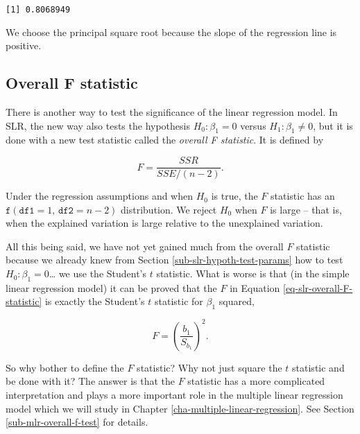 \documentclass[]{book}
\newenvironment{Shaded}{\begin{snugshade}}{\end{snugshade}}
\newcommand{\KeywordTok}[1]{\textcolor[rgb]{0.13,0.29,0.53}{\textbf{{#1}}}}
\newcommand{\NormalTok}[1]{{#1}}
\numberwithin{equation}{chapter}
\numberwithin{figure}{chapter}
\theoremstyle{plain}
\theoremstyle{definition}
\theoremstyle{remark}
\theoremstyle{definition}
\theoremstyle{definition}
\theoremstyle{remark}
\begin{document}
\begin{Shaded}
\end{Shaded}

\begin{verbatim}
[1] 0.8068949
\end{verbatim}

We choose the principal square root because the slope of the regression
line is positive.

\subsection{Overall F statistic}\label{sub-slr-overall-f-statistic}

There is another way to test the significance of the linear regression
model. In SLR, the new way also tests the hypothesis
\(H_{0}:\beta_{1}=0\) versus \(H_{1}:\beta_{1}\neq0\), but it is done
with a new test statistic called the \emph{overall F statistic}. It is
defined by

\begin{equation}
\label{eq-slr-overall-F-statistic}
F=\frac{SSR}{SSE/(n-2)}.
\end{equation}

Under the regression assumptions and when \(H_{0}\) is true, the \(F\)
statistic has an \(\mathtt{f}(\mathtt{df1}=1,\,\mathtt{df2}=n-2)\)
distribution. We reject \(H_{0}\) when \(F\) is large -- that is, when
the explained variation is large relative to the unexplained variation.

All this being said, we have not yet gained much from the overall \(F\)
statistic because we already knew from Section
\ref{sub-slr-hypoth-test-params} how to test
\(H_{0}:\beta_{1} = 0\)\ldots{} we use the Student's \(t\) statistic.
What is worse is that (in the simple linear regression model) it can be
proved that the \(F\) in Equation \eqref{eq-slr-overall-F-statistic} is
exactly the Student's \(t\) statistic for \(\beta_{1}\) squared,

\begin{equation}
F=\left(\frac{b_{1}}{S_{b_{1}}}\right)^{2}.
\end{equation}

So why bother to define the \(F\) statistic? Why not just square the
\(t\) statistic and be done with it? The answer is that the \(F\)
statistic has a more complicated interpretation and plays a more
important role in the multiple linear regression model which we will
study in Chapter \ref{cha-multiple-linear-regression}. See Section
\ref{sub-mlr-overall-f-test} for details.
\end{document}
